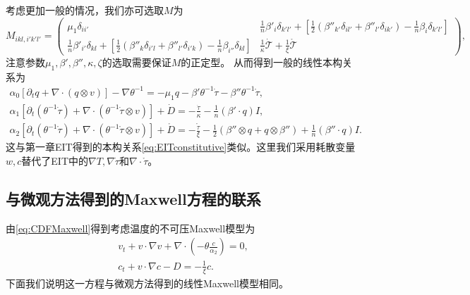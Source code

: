 	考虑更加一般的情况，我们亦可选取$M$为
	\begin{equation*}
		M_{ikl,i'k'l'} = \left( \begin{array}{ccc} 
			\mu_1 \delta_{ii' } & \frac{1}{n}\beta'_i \delta_{k'l'} +  [\frac{1}{2} (\beta''_{k'} \delta_{il'} + \beta''_{l'} \delta_{ik'}) - \frac{1}{n} \beta_{i} \delta_{k'l'}]\\
			\frac{1}{n}\beta'_{i'} \delta_{kl} +  [\frac{1}{2} (\beta''_{k} \delta_{i'l} + \beta''_{l'} \delta_{i'k}) - \frac{1}{n} \beta_{i''} \delta_{kl}] &  \frac{1}{\kappa} \dot{\mathcal{T}} + \frac{1}{\xi} \mathring{\mathcal{T}}  
		\end{array} \right),
	\end{equation*} 
	注意参数$\mu_1,\beta',\beta'',\kappa,\zeta$的选取需要保证$M$的正定型。
	从而得到一般的线性本构关系为
	\begin{subequations}
		\begin{align*}
			\alpha_0 [\partial_t q +  \nabla \cdot (q \otimes v)] - \nabla \theta^{-1} = - \mu_1 q -\beta' \theta^{-1} \dot{\tau} - \beta'' \theta^{-1} \mathring{\tau} , \\
			\alpha_1[\partial_t (\theta^{-1} \dot{\tau}) + \nabla \cdot (\theta^{-1} \dot{\tau} \otimes v)] + \dot{D} = -\frac{\dot{\tau}}{\kappa} - \frac{1}{n}(\beta' \cdot q) I, \\
			\alpha_2[\partial_t (\theta^{-1} \mathring{\tau}) + \nabla \cdot (\theta^{-1} \mathring{\tau} \otimes v)] + \mathring{D} = -\frac{\mathring{\tau}}{\xi} - \frac{1}{2} (\beta''  \otimes q + q \otimes \beta'') + \frac{1}{n}(\beta'' \cdot q) I. 
		\end{align*}
	\end{subequations}
	这与第一章EIT得到的本构关系\eqref{eq:EITconstitutive}类似。这里我们采用耗散变量$w,c$替代了EIT中的$\nabla T, \nabla \dot{\tau}$和$\nabla \cdot{\mathring{\tau}}$。
    
	\subsection{与微观方法得到的Maxwell方程的联系}

	由\eqref{eq:CDFMaxwell}得到考虑温度的不可压Maxwell模型为
	\begin{subequations} \label{eq:Tmaxwell}
	\begin{align}
		v_t + v \cdot \nabla v + \nabla \cdot (-\theta \frac{c}{\alpha_2}) = 0, \\
		c_t + v \cdot \nabla c - D = -\frac{1}{\xi} c.
		\end{align}
	\end{subequations}
	下面我们说明这一方程与微观方法得到的线性Maxwell模型相同。

